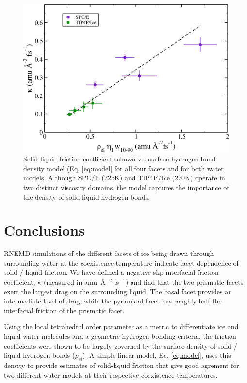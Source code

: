 \begin{figure}
\includegraphics[width=\linewidth]{Figures/simpleModel}
\caption{\label{fig:simpleModel} Solid-liquid friction coefficients
  shown vs. surface hydrogen bond density model (Eq. \eqref{eq:model}
  for all four facets and for both water models.  Although SPC/E
  (225K) and TIP4P/Ice (270K) operate in two distinct viscosity
  domains, the model captures the importance of the density of
  solid-liquid hydrogen bonds.}
\end{figure}                                            

\section{Conclusions}
RNEMD simulations of the different facets of ice being drawn through
surrounding water at the coexistence temperature indicate
facet-dependence of solid / liquid friction.  We have defined a
negative slip interfacial friction coefficient, $\kappa$ (measured in
amu~\AA$^{-2}$ fs$^{-1}$) and find that the two prismatic facets exert
the largest drag on the surrounding liquid.  The basal facet provides
an intermediate level of drag, while the pyramidal facet has roughly
half the interfacial friction of the prismatic facet.

Using the local tetrahedral order parameter as a metric to
differentiate ice and liquid water molecules and a geometric hydrogen
bonding criteria, the friction coefficients were shown to be largely
governed by the surface density of solid / liquid hydrogen bonds
($\rho_{sl}$).  A simple linear model, Eq. \eqref{eq:model}, uses
this density to provide estimates of solid-liquid friction that give
good agrement for two different water models at their respective
coexistence temperatures.

